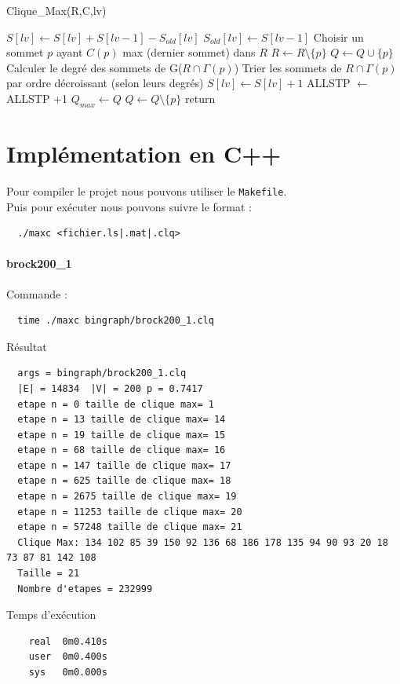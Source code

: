 \documentclass{article}
\begin{document}
\begin{algorithm}
\caption{Clique\_Max(R,C,lv)}
\begin{algorithmic}
  \State $S[lv] \gets S[lv] + S[lv-1] -S_{old}[lv]$
  \State $S_{old}[lv]\gets S[lv-1]$
    \State Choisir un sommet $p$ ayant $C(p)$ max (dernier sommet) dans $R$
    \State $R \gets R \setminus \{p\}$
      \State $Q \gets Q \cup \{p\}$
          \State Calculer le degré des sommets de G($R \cap \Gamma(p)$)
          \State Trier les sommets de $R \cap \Gamma(p)$ par ordre décroissant
          \State (selon leurs degrés)
        \EndIf
        \State {}
        \State $S[lv] \gets S[lv]+1$
        \State ALLSTP $\gets$ ALLSTP +1
        \State  {}
        $Q_{max} \gets Q$
      \EndIf
      \State $Q \gets Q\setminus \{p\}$
    \Else
      \State return
    \EndIf
  \EndWhile
\EndProcedure
\end{algorithmic}
\end{algorithm}
\section{Implémentation en C++}
Pour compiler le projet nous pouvons utiliser le \texttt{Makefile}.\\
Puis pour exécuter nous pouvons suivre le format :
\begin{verbatim}
  ./maxc <fichier.ls|.mat|.clq>
\end{verbatim}
\paragraph{brock200\_1}
Commande :
\begin{verbatim}
  time ./maxc bingraph/brock200_1.clq
\end{verbatim}
Résultat
\begin{verbatim}
  args = bingraph/brock200_1.clq
  |E| = 14834  |V| = 200 p = 0.7417
  etape n = 0 taille de clique max= 1
  etape n = 13 taille de clique max= 14
  etape n = 19 taille de clique max= 15
  etape n = 68 taille de clique max= 16
  etape n = 147 taille de clique max= 17
  etape n = 625 taille de clique max= 18
  etape n = 2675 taille de clique max= 19
  etape n = 11253 taille de clique max= 20
  etape n = 57248 taille de clique max= 21
  Clique Max: 134 102 85 39 150 92 136 68 186 178 135 94 90 93 20 18 73 87 81 142 108
  Taille = 21
  Nombre d'etapes = 232999
\end{verbatim}
Temps d'exécution
\begin{verbatim}
    real  0m0.410s
    user  0m0.400s
    sys   0m0.000s
\end{verbatim}
\end{document}
